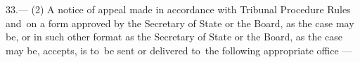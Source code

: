 \documentclass[12pt,a4paper]{article}
\begin{document}
33.—%
%
%
%
%
%
(2) 
A notice of appeal made in accordance with Tribunal Procedure Rules and~on a form approved by the Secretary of State
or the Board, as the case may be, or in such other format as the Secretary of State
or the Board, as the case may be, accepts, is to~be sent or delivered to~the following appropriate office%
—
\end{document}
